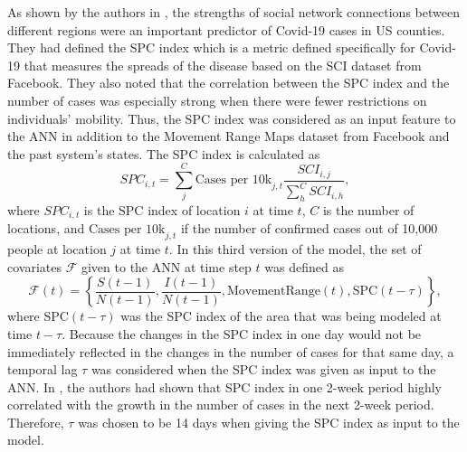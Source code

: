 As shown by the authors in \cite{kuchlerGeographicSpreadCOVID192020}, the strengths of social network connections between different regions were an important predictor of Covid-19 cases in US counties.
They had defined the \gls{SPC} index which is a metric defined specifically for Covid-19 that measures the spreads of the disease based on the \gls{SCI} dataset from Facebook.
They also noted that the correlation between the \gls{SPC} index and the number of cases was especially strong when there were fewer restrictions on individuals' mobility.
Thus, the \gls{SPC} index was considered as an input feature to the \gls{ANN} in addition to the Movement Range Maps dataset from Facebook and the past system's states.
The \gls{SPC} index is calculated as
\begin{equation*}
    SPC_{i,t} = \sum_j^C \text{Cases per 10k}_{j,t} \frac{SCI_{i,j}}{\sum_h^C SCI_{i,h}},
\end{equation*}
where $SPC_{i,t}$ is the \gls{SPC} index of location $i$ at time $t$, $C$ is the number of locations, and $\text{Cases per 10k}_{j,t}$ if the number of confirmed cases out of 10,000 people at location $j$ at time $t$.
In this third version of the model, the set of covariates $\mathcal{F}$ given to the \gls{ANN} at time step $t$ was defined as
\begin{equation*}
    \mathcal{F}(t) = \left\lbrace \frac{S(t-1)}{N(t-1)}, \frac{I(t-1)}{N(t-1)}, \text{MovementRange}(t), \text{SPC}(t - \tau) \right\rbrace,
\end{equation*}
where $\text{SPC}(t - \tau)$ was the \gls{SPC} index of the area that was being modeled at time $t - \tau$.
Because the changes in the \gls{SPC} index in one day would not be immediately reflected in the changes in the number of cases for that same day, a temporal lag $\tau$ was considered when the \gls{SPC} index was given as input to the \gls{ANN}.
In \cite{kuchlerGeographicSpreadCOVID192020}, the authors had shown that \gls{SPC} index in one 2-week period highly correlated with the growth in the number of cases in the next 2-week period.
Therefore, $\tau$ was chosen to be 14 days when giving the \gls{SPC} index as input to the model.